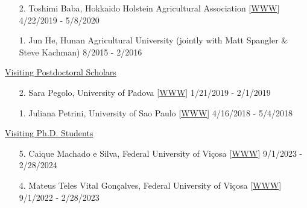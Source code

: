 \documentclass[margin,line,10pt]{res}
\begin{document}
\begin{resume}
\begin{enumerate}
  \vspace{0.3cm}

      
\item [2.] Toshimi Baba, Hokkaido Holstein Agricultural Association [\textcolor{blue}{\href{https://researchmap.jp/t-baba/?lang=english}{WWW}}]  \hfill  4/22/2019 - 5/8/2020
  
  \vspace{0.3cm}

\item [1.] Jun He, Hunan Agricultural University (jointly with Matt Spangler \& Steve Kachman)  \hfill  8/2015 - 2/2016 
\end{enumerate}



\begin{flushleft}
\hspace{0.2cm} \underline{Visiting Postdoctoral Scholars}
\end{flushleft}
\begin{enumerate}
\item [2.] Sara Pegolo,  University of Padova [\textcolor{blue}{\href{https://www.researchgate.net/profile/Sara_Pegolo}{WWW}}]  \hfill 1/21/2019 - 2/1/2019
  
  \vspace{0.3cm}

\item [1.] Juliana Petrini,  University of Sao Paulo  [\textcolor{blue}{\href{https://www.researchgate.net/profile/Juliana_Petrini}{WWW}}]  \hfill  4/16/2018 - 5/4/2018
\end{enumerate}






\begin{flushleft}
\hspace{0.2cm} \underline{Visiting Ph.D. Students}
\end{flushleft}
\begin{enumerate}

  \item [5.] Caique Machado e Silva, Federal University of Vi\c cosa [\textcolor{blue}{\href{https://www.researchgate.net/profile/Caique-Silva}{WWW}}]  \hfill  9/1/2023 - 2/28/2024

  \vspace{0.3cm}

  \item [4.] Mateus Teles Vital Gon\c calves, Federal University of Vi\c cosa [\textcolor{blue}{\href{https://goncalvesmateu.github.io}{WWW}}]  \hfill  9/1/2022 - 2/28/2023


\end{enumerate}
\end{resume}
\end{document}
